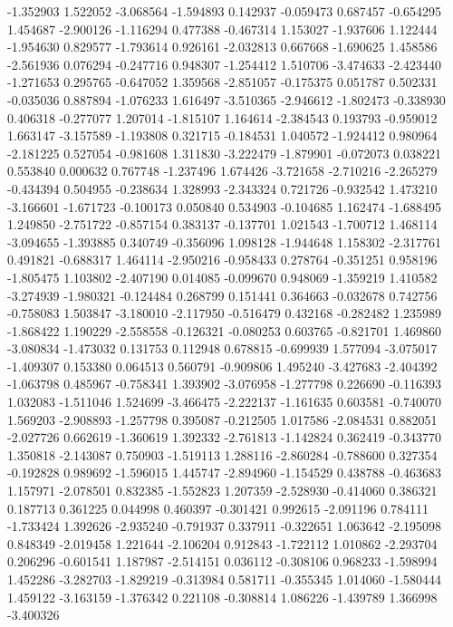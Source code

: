 -1.352903
1.522052
-3.068564
-1.594893
0.142937
-0.059473
0.687457
-0.654295
1.454687
-2.900126
-1.116294
0.477388
-0.467314
1.153027
-1.937606
1.122444
-1.954630
0.829577
-1.793614
0.926161
-2.032813
0.667668
-1.690625
1.458586
-2.561936
0.076294
-0.247716
0.948307
-1.254412
1.510706
-3.474633
-2.423440
-1.271653
0.295765
-0.647052
1.359568
-2.851057
-0.175375
0.051787
0.502331
-0.035036
0.887894
-1.076233
1.616497
-3.510365
-2.946612
-1.802473
-0.338930
0.406318
-0.277077
1.207014
-1.815107
1.164614
-2.384543
0.193793
-0.959012
1.663147
-3.157589
-1.193808
0.321715
-0.184531
1.040572
-1.924412
0.980964
-2.181225
0.527054
-0.981608
1.311830
-3.222479
-1.879901
-0.072073
0.038221
0.553840
0.000632
0.767748
-1.237496
1.674426
-3.721658
-2.710216
-2.265279
-0.434394
0.504955
-0.238634
1.328993
-2.343324
0.721726
-0.932542
1.473210
-3.166601
-1.671723
-0.100173
0.050840
0.534903
-0.104685
1.162474
-1.688495
1.249850
-2.751722
-0.857154
0.383137
-0.137701
1.021543
-1.700712
1.468114
-3.094655
-1.393885
0.340749
-0.356096
1.098128
-1.944648
1.158302
-2.317761
0.491821
-0.688317
1.464114
-2.950216
-0.958433
0.278764
-0.351251
0.958196
-1.805475
1.103802
-2.407190
0.014085
-0.099670
0.948069
-1.359219
1.410582
-3.274939
-1.980321
-0.124484
0.268799
0.151441
0.364663
-0.032678
0.742756
-0.758083
1.503847
-3.180010
-2.117950
-0.516479
0.432168
-0.282482
1.235989
-1.868422
1.190229
-2.558558
-0.126321
-0.080253
0.603765
-0.821701
1.469860
-3.080834
-1.473032
0.131753
0.112948
0.678815
-0.699939
1.577094
-3.075017
-1.409307
0.153380
0.064513
0.560791
-0.909806
1.495240
-3.427683
-2.404392
-1.063798
0.485967
-0.758341
1.393902
-3.076958
-1.277798
0.226690
-0.116393
1.032083
-1.511046
1.524699
-3.466475
-2.222137
-1.161635
0.603581
-0.740070
1.569203
-2.908893
-1.257798
0.395087
-0.212505
1.017586
-2.084531
0.882051
-2.027726
0.662619
-1.360619
1.392332
-2.761813
-1.142824
0.362419
-0.343770
1.350818
-2.143087
0.750903
-1.519113
1.288116
-2.860284
-0.788600
0.327354
-0.192828
0.989692
-1.596015
1.445747
-2.894960
-1.154529
0.438788
-0.463683
1.157971
-2.078501
0.832385
-1.552823
1.207359
-2.528930
-0.414060
0.386321
0.187713
0.361225
0.044998
0.460397
-0.301421
0.992615
-2.091196
0.784111
-1.733424
1.392626
-2.935240
-0.791937
0.337911
-0.322651
1.063642
-2.195098
0.848349
-2.019458
1.221644
-2.106204
0.912843
-1.722112
1.010862
-2.293704
0.206296
-0.601541
1.187987
-2.514151
0.036112
-0.308106
0.968233
-1.598994
1.452286
-3.282703
-1.829219
-0.313984
0.581711
-0.355345
1.014060
-1.580444
1.459122
-3.163159
-1.376342
0.221108
-0.308814
1.086226
-1.439789
1.366998
-3.400326
